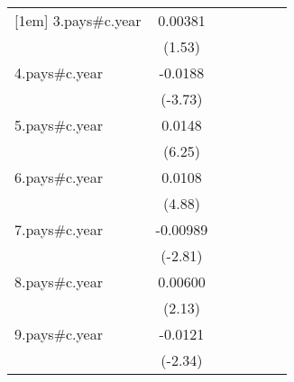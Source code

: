 {\begin{tabular}{l*{6}{c}}
[1em]
3.pays#c.year       &     0.00381         &                     &                     &                     &                     &                     \\
                    &      (1.53)         &                     &                     &                     &                     &                     \\
[1em]
4.pays#c.year       &     -0.0188\sym{***}&                     &                     &                     &                     &                     \\
                    &     (-3.73)         &                     &                     &                     &                     &                     \\
[1em]
5.pays#c.year       &      0.0148\sym{***}&                     &                     &                     &                     &                     \\
                    &      (6.25)         &                     &                     &                     &                     &                     \\
[1em]
6.pays#c.year       &      0.0108\sym{***}&                     &                     &                     &                     &                     \\
                    &      (4.88)         &                     &                     &                     &                     &                     \\
[1em]
7.pays#c.year       &    -0.00989\sym{**} &                     &                     &                     &                     &                     \\
                    &     (-2.81)         &                     &                     &                     &                     &                     \\
[1em]
8.pays#c.year       &     0.00600\sym{*}  &                     &                     &                     &                     &                     \\
                    &      (2.13)         &                     &                     &                     &                     &                     \\
[1em]
9.pays#c.year       &     -0.0121\sym{*}  &                     &                     &                     &                     &                     \\
                    &     (-2.34)         &                     &                     &                     &                     &                     \\

\end{tabular}}
